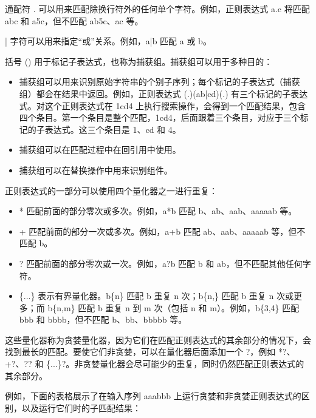 
通配符 . 可以用来匹配除换行符外的任何单个字符。例如，正则表达式 a.c 将匹配 abc 和 a5c，但不匹配 ab5c、ac 等。


| 字符可以用来指定“或”关系。例如，a|b 匹配 a 或 b。


括号 () 用于标记子表达式，也称为捕获组。捕获组可以用于多种目的：

\begin{itemize}
\item
捕获组可以用来识别原始字符串的个别子序列；每个标记的子表达式（捕获组）都会在结果中返回。例如，正则表达式 (.)(ab|cd)(.) 有三个标记的子表达式。对这个正则表达式在 1cd4 上执行搜索操作，会得到一个匹配结果，包含四个条目。第一个条目是整个匹配，1cd4，后面跟着三个条目，对应于三个标记的子表达式。这三个条目是 1、cd 和 4。

\item
捕获组可以在匹配过程中在回引用中使用。

\item
捕获组可以在替换操作中用来识别组件。
\end{itemize}


正则表达式的一部分可以使用四个量化器之一进行重复：

\begin{itemize}
\item
* 匹配前面的部分零次或多次。例如，a*b 匹配 b、ab、aab、aaaaab 等。

\item
+ 匹配前面的部分一次或多次。例如，a+b 匹配 ab、aab、aaaaab 等，但不匹配 b。

\item
? 匹配前面的部分零次或一次。例如，a?b 匹配 b 和 ab，但不匹配其他任何字符。

\item
\{...\} 表示有界量化器。b\{n\} 匹配 b 重复 n 次；b\{n,\} 匹配 b 重复 n 次或更多；而 b\{n,m\} 匹配 b 重复 n 到 m 次（包括 n 和 m）。例如，b\{3,4\} 匹配 bbb 和 bbbb，但不匹配 b、bb、bbbbb 等。
\end{itemize}

这些量化器称为贪婪量化器，因为它们在匹配正则表达式的其余部分的情况下，会找到最长的匹配。要使它们非贪婪，可以在量化器后面添加一个 ?，例如 *?、+?、?? 和 \{...\}?。非贪婪量化器会尽可能少的重复，同时仍然匹配正则表达式的其余部分。

例如，下面的表格展示了在输入序列 aaabbb 上运行贪婪和非贪婪正则表达式的区别，以及运行它们时的子匹配结果：

